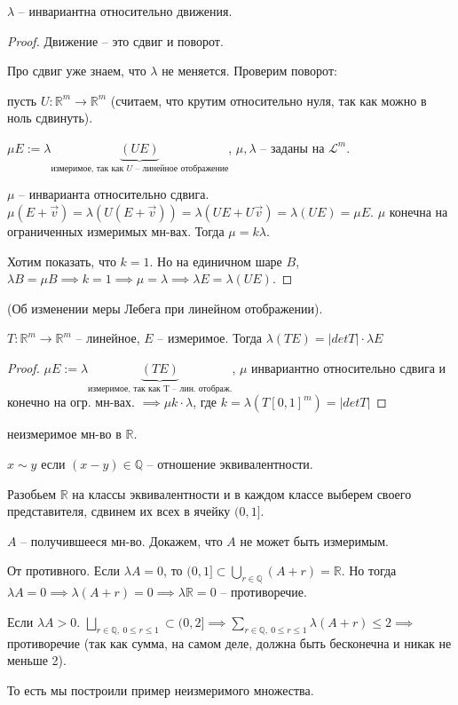 \begin{theorem}
    $\lambda$ -- инвариантна относительно движения.
\end{theorem}
\begin{proof}
    Движение -- это сдвиг и поворот.

    Про сдвиг уже знаем, что $\lambda$ не меняется. Проверим поворот:

    пусть $U: \mathbb{R}^m \rightarrow \mathbb{R}^m$ (считаем, что крутим относительно нуля, так как можно в ноль сдвинуть).

    $\mu E := \lambda \underbrace{(UE)}_{\text{измеримое, так как $U$ -- линейное отображение}}$, $\mu, \lambda$ -- заданы на $\mathscr{L}^m$.

    $\mu$ -- инварианта относительно сдвига. $\mu (E + \vec{v}) = \lambda (U(E + \vec{v})) = \lambda(UE + U \vec{v}) = \lambda (UE) = \mu E$. $\mu$ конечна на ограниченных измеримых мн-вах. Тогда $\mu = k \lambda$.

    Хотим показать, что $k = 1$. Но на единичном шаре $B$, $\lambda B = \mu B \implies k = 1 \implies \mu = \lambda \implies \lambda E = \lambda (UE)$.
\end{proof}

\begin{theorem}
    (Об изменении меры Лебега при линейном отображении).

    $T: \mathbb{R}^m \rightarrow \mathbb{R}^m$ -- линейное, $E$ -- измеримое. Тогда $\lambda (TE) = |det T| \cdot \lambda E$
\end{theorem}
\begin{proof}
    $\mu E := \lambda \underbrace{(TE)}_{\text{измеримое, так как T -- лин. отображ.}}$, $\mu$ инвариантно относительно сдвига и конечно на огр. мн-вах. $\implies \mu k \cdot \lambda$, где $k = \lambda (T [0, 1]^m) = |det T|$

\end{proof}

\begin{example}
    неизмеримое мн-во в $\mathbb{R}$.

    $x \sim y$ если $(x - y) \in \mathbb{Q}$ -- отношение эквивалентности.

    Разобьем $\mathbb{R}$ на классы эквивалентности и в каждом классе выберем своего представителя, сдвинем их всех в ячейку $(0, 1]$.

    $A$ --  получившееся мн-во. Докажем, что $A$ не может быть измеримым. 

    От противного. Если $\lambda A = 0$, то $(0, 1] \subset \bigcup_{r \in \mathbb{Q}} (A + r) = \mathbb{R}$. Но тогда $\lambda A = 0 \implies \lambda (A + r) = 0 \implies \lambda \mathbb{R} = 0$ -- противоречие.

    Если $\lambda A > 0$. $\bigsqcup_{r \in \mathbb{Q}, \ 0 \leq r \leq 1} \subset (0, 2] \implies \sum_{r \in \mathbb{Q}, \ 0 \leq r \leq 1} \lambda (A + r) \leq 2 \implies $ противоречие (так как сумма, на самом деле, должна быть бесконечна и никак не меньше 2).

    То есть мы построили пример неизмеримого множества.
\end{example}